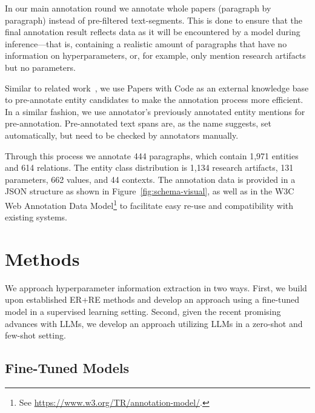 
In our main annotation round we annotate whole papers (paragraph by paragraph) instead of pre-filtered text-segments. This is done to ensure that the final annotation result reflects data as it will be encountered by a model during inference---that is, containing a realistic amount of paragraphs that have no information on hyperparameters, or, for example, only mention research artifacts but no parameters.

Similar to related work~\cite{Jain2020scirex}, we use Papers with Code as an external knowledge base to pre-annotate entity candidates to make the annotation process more efficient. In a similar fashion, we use annotator's previously annotated entity mentions for pre-annotation. Pre-annotated text spans are, as the name suggests, set automatically, but need to be checked by annotators manually.

Through this process we annotate 444 paragraphs, which contain 1,971 entities and 614 relations. The entity class distribution is 1,134 research artifacts, 131 parameters, 662 values, and 44 contexts. The annotation data is provided in a JSON structure as shown in Figure~\ref{fig:schema-visual}, as well as in the W3C Web Annotation Data Model\footnote{See \url{https://www.w3.org/TR/annotation-model/}.} to facilitate easy re-use and compatibility with existing systems.




\section{Methods}\label{sec:methods}

We approach hyperparameter information extraction in two ways. First, we build upon established ER+RE methods and develop an approach using a fine-tuned model in a supervised learning setting. Second, given the recent promising advances with LLMs, we develop an approach utilizing LLMs in a zero-shot and few-shot setting.

\subsection{Fine-Tuned Models}

